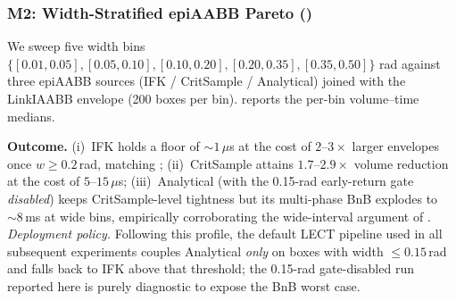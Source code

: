 \documentclass[journal]{IEEEtran}
\begin{document}
\subsubsection{M2: Width-Stratified epiAABB Pareto
()}
We sweep five width bins
$\{[0.01,0.05],[0.05,0.10],[0.10,0.20],[0.20,0.35],[0.35,0.50]\}$ rad
against three epiAABB sources (IFK / CritSample / Analytical)
joined with the LinkIAABB envelope (200 boxes per bin).
 reports the per-bin volume--time medians.

\begin{table}[ht]
\centering
\caption{epiAABB volume--time Pareto across width bins (M2). Analytical
times in the wide-bin regime are dominated by the unresolved-cell count
of the Phase-3 BnB, which is sensitive to the per-bin sample geometry
rather than monotone in $w$; this explains the non-monotone
$8170.8\,\mu\text{s}\!>\!7559.9\,\mu\text{s}$ ordering at the two
widest bins.}
\label{tab:m2_pareto}
\end{table}

\textbf{Outcome.} (i)~IFK holds a floor of ${\sim}1\,\mu$s at the cost
of $2\text{–}3\times$ larger envelopes once $w\!\geq\!0.2$\,rad,
matching ;
(ii)~CritSample attains $1.7\text{–}2.9\times$ volume reduction at
the cost of $5\text{–}15\,\mu$s;
(iii)~Analytical (with the 0.15-rad early-return gate \emph{disabled})
keeps CritSample-level tightness but its multi-phase BnB explodes to
${\sim}8$\,ms at wide bins, empirically corroborating the wide-interval
argument of .
\emph{Deployment policy.} Following this profile, the default LECT
pipeline used in all subsequent experiments couples Analytical
\emph{only} on boxes with width $\le 0.15$\,rad and falls back to
IFK above that threshold; the 0.15-rad gate-disabled run reported
here is purely diagnostic to expose the BnB worst case.
\end{document}
